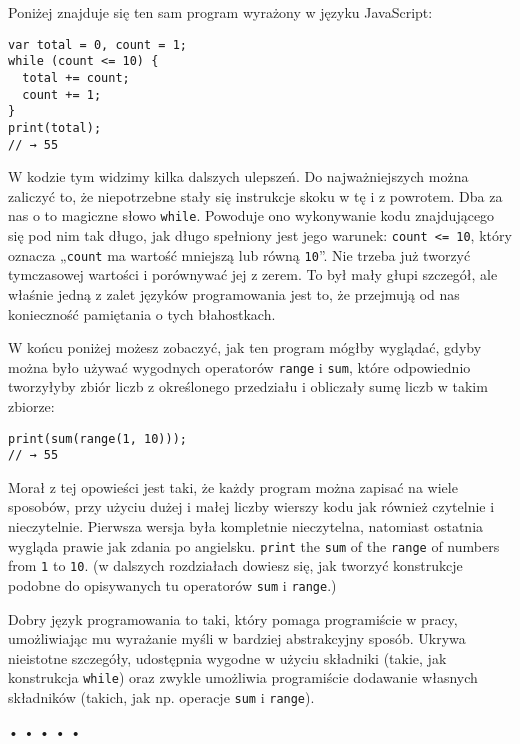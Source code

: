   
Poniżej znajduje się ten sam program wyrażony w języku JavaScript:

  
  
\begin{verbatim} 
var total = 0, count = 1;
while (count <= 10) {
  total += count;
  count += 1;
}
print(total);
// → 55
\end{verbatim}
  
  
W kodzie tym widzimy kilka dalszych ulepszeń. Do najważniejszych można zaliczyć to, że niepotrzebne stały się instrukcje skoku w tę i z powrotem. Dba za nas o to magiczne słowo \texttt{while}. Powoduje ono wykonywanie kodu znajdującego się pod nim tak długo, jak długo spełniony jest jego warunek: \texttt{count <= 10}, który oznacza „\texttt{count} ma wartość mniejszą lub równą \texttt{10}”. Nie trzeba już tworzyć tymczasowej wartości i porównywać jej z zerem. To był mały głupi szczegół, ale właśnie jedną z zalet języków programowania jest to, że przejmują od nas konieczność pamiętania o tych błahostkach.

  
W końcu poniżej możesz zobaczyć, jak ten program mógłby wyglądać, gdyby można było używać wygodnych operatorów \texttt{range} i \texttt{sum}, które odpowiednio tworzyłyby zbiór liczb z określonego przedziału i obliczały sumę liczb w takim zbiorze:

  
\begin{verbatim} 
print(sum(range(1, 10)));
// → 55
\end{verbatim}
  
Morał z tej opowieści jest taki, że każdy program można zapisać na wiele sposobów, przy użyciu dużej i małej liczby wierszy kodu jak również czytelnie i nieczytelnie. Pierwsza wersja była kompletnie nieczytelna, natomiast ostatnia wygląda prawie jak zdania po angielsku. \texttt{print} the \texttt{sum} of the \texttt{range} of numbers from \texttt{1} to \texttt{10}. (w dalszych rozdziałach dowiesz się, jak tworzyć konstrukcje podobne do opisywanych tu operatorów \texttt{sum} i \texttt{range}.)

  
Dobry język programowania to taki, który pomaga programiście w pracy, umożliwiając mu wyrażanie myśli w bardziej abstrakcyjny sposób. Ukrywa nieistotne szczegóły, udostępnia wygodne w użyciu składniki (takie, jak konstrukcja \texttt{while}) oraz zwykle umożliwia programiście dodawanie własnych składników (takich, jak np. operacje \texttt{sum} i \texttt{range}).


\begin{center}
• • • • •
\end{center}

